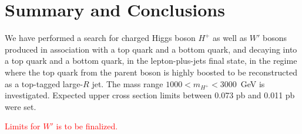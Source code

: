 \section{Summary and Conclusions}
\label{sec:Summary}

We have performed a search for charged Higgs boson $H^{+}$ as well as $W'$ bosons produced in association with a top quark and a bottom quark, and decaying into a top quark and a bottom quark, in the lepton-plus-jets final state, in the regime where the top quark from the parent boson is highly boosted to be reconstructed as a top-tagged large-$R$ jet. The mass range $1000 < m_{H^{+}} < 3000$~GeV is investigated. Expected upper cross section limits between 0.073 pb and 0.011 pb were set. 

{\textcolor{red}{Limits for $W'$ is to be finalized.}}
